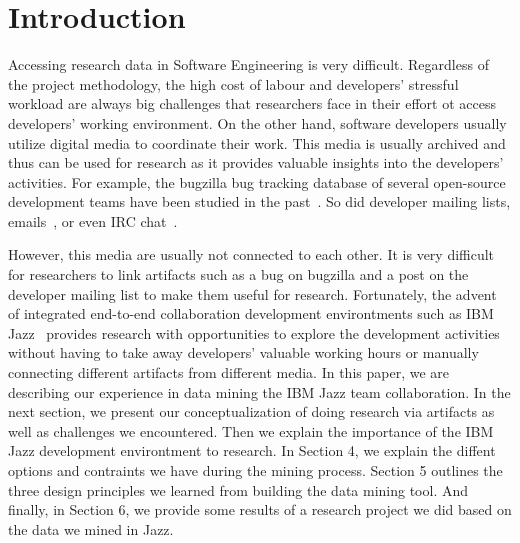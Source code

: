 \section{Introduction}
Accessing research data in Software Engineering is very difficult. Regardless of
the project methodology, the high cost of labour and developers' stressful
workload are always big challenges that researchers face in their effort ot
access developers' working environment. On the other hand, software developers
usually utilize digital media to coordinate their work. This media is 
usually archived and thus can be used for research as it provides valuable
insights into the developers' activities. For example, the bugzilla bug
tracking database of several open-source development teams have been studied in
the past~\cite{bettenburg:2007:tr}. So did developer mailing lists, emails~\cite{Bird:2006:MSR}, or even IRC chat~\cite{Cataldo:2006:CSCW}.


However, this media are usually not connected to each other. It is very difficult
for researchers to link artifacts such as a bug on bugzilla and a post on the
developer mailing list to make them useful for research. Fortunately, the advent
of integrated end-to-end collaboration development environtments such as IBM Jazz~\cite{IBM:2008:url} provides research with opportunities to explore the development activities without having to take away developers' valuable working hours or manually connecting different artifacts from different media. In
this paper, we are describing our experience in data mining the IBM Jazz team
collaboration. In the next section, we present our conceptualization of doing
research via artifacts as well as challenges we encountered. Then we explain the
importance of the IBM Jazz development environtment to research. In Section 4, we
explain the diffent options and contraints we have during the mining process.
Section 5 outlines the three design principles we learned from building the data
mining tool. And finally, in Section 6, we provide some results of a research
project we did based on the data we mined in Jazz.


